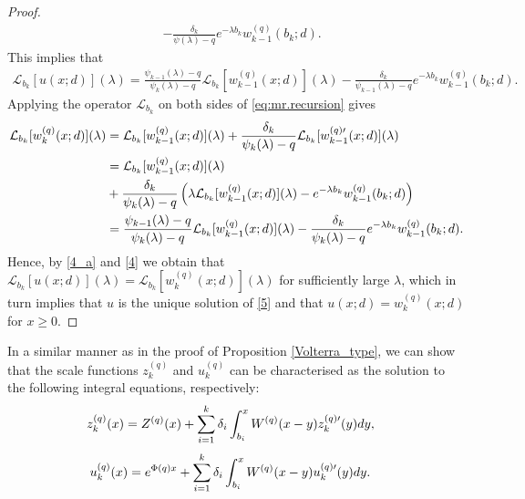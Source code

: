 \documentclass[12pt,reqno]{amsart}
\newcommand{\red}{\textcolor[rgb]{1.00,0.00,0.00}}
\theoremstyle{definition}
\theoremstyle{remark}
\begin{document}
\begin{proof}
\begin{align*}
&-\frac{\delta_k}{\psi(\lambda)-q}e^{-\lambda b_k}w_{k-1}^{(q)}(b_k;d).
\end{align*}
This implies that
\begin{align}\label{4_a}
\mathcal{L}_{b_k}[u(x;d)](\lambda)=\frac{\psi_{k-1}(\lambda)-q}{\psi_k(\lambda)-q}\mathcal{L}_{b_k}[w_{k-1}^{(q)}(x;d)](\lambda)-
\frac{\delta_k}{\psi_{k-1}(\lambda)-q}e^{-\lambda b_{k}}w_{k-1}^{(q)}(b_k;d).
\end{align}
 Applying the operator $\mathcal{L}_{b_k}$ on both sides of \eqref{eq:mr.recursion} gives
\begin{align}\label{4}
\mathcal{L}_{b_k}[w_k^{(q)}(x;d)](\lambda)&=\mathcal{L}_{b_k}[w_{k-1}^{(q)}(x;d)](\lambda)+\frac{\delta_k}{\psi_k(\lambda)-q}
\mathcal{L}_{b_k}[w_{k-1}^{(q)\prime}(x;d)](\lambda)\notag\\
&=\mathcal{L}_{b_k}[w_{k-1}^{(q)}(x;d)](\lambda)\notag\\
&+\frac{\delta_k}{\psi_k(\lambda)-q}\left(\lambda\mathcal{L}_{b_k}[w_{k-1}^{(q)}(x;d)](\lambda)-e^{-\lambda b_{k}}w_{k-1}^{(q)}(b_k;d)\right)\notag\\
&=\frac{\psi_{k-1}(\lambda)-q}{\psi_k(\lambda)-q}\mathcal{L}_{b_k}[w_{k-1}^{(q)}(x;d)](\lambda)-\frac{\delta_k}{\psi_k(\lambda)-q}e^{-\lambda b_{k}}w_{k-1}^{(q)}(b_k;d).
\end{align}
Hence, by \eqref{4_a} and \eqref{4} we obtain that $\mathcal{L}_{b_k}[u(x;d)](\lambda)=\mathcal{L}_{b_k}[w_{k}^{(q)}(x;d)](\lambda)$ for sufficiently large $\lambda$, which in turn implies that $u$ is the unique solution of
	\eqref{5} and that $u(x;d)=w_{k}^{(q)}(x;d)$ for $x\geq0$.
	\end{proof}
	In a similar manner as in the proof of Proposition \ref{Volterra_type}, we can show that the scale functions $z_k^{(q)}$  and $u_k^{(q)}$
can be characterised as the solution to the following integral equations, respectively:
	\begin{align*}%
	z_k^{(q)}(x)&
	=Z^{(q)}(x)+\sum_{i=1}^k\delta_i\int_{b_i}^xW^{(q)}(x-y)z_k^{(q)\prime}(y)dy,\notag
	\end{align*}
	\begin{align*}%
u_k^{(q)}(x)&
	=e^{\Phi(q) x}+\sum_{i=1}^k\delta_i\int_{b_i}^xW^{(q)}(x-y)u_k^{(q)\prime}(y)dy.\notag
	\end{align*}
	
\end{document}
